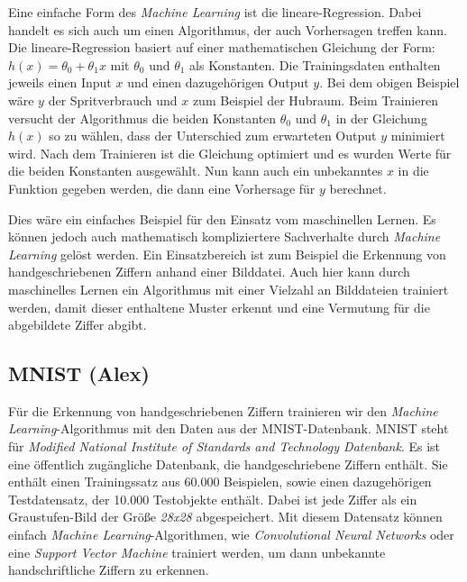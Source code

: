 Eine einfache Form des \textit{Machine Learning} ist die lineare-Regression. Dabei handelt es sich auch um einen Algorithmus, der auch Vorhersagen treffen kann.
Die lineare-Regression basiert auf einer mathematischen Gleichung der Form: $h(x) = \theta_0 + \theta_1x $ mit $\theta_0$ und $\theta_1$ als Konstanten.
Die Trainingsdaten enthalten jeweils einen Input $x$ und einen dazugehörigen Output $y$. Bei dem obigen Beispiel wäre $y$ der Spritverbrauch und $x$ zum Beispiel der
Hubraum. Beim Trainieren versucht der Algorithmus die beiden Konstanten $\theta_0$ und $\theta_1$ in der Gleichung $h(x)$ so zu wählen, 
dass der Unterschied zum erwarteten Output $y$ minimiert wird. Nach dem Trainieren ist die Gleichung optimiert und es wurden Werte für die beiden Konstanten ausgewählt.
Nun kann auch ein unbekanntes $x$ in die Funktion gegeben werden, die dann eine Vorhersage für $y$ berechnet.\cite{simon_2015}

Dies wäre ein einfaches Beispiel für den Einsatz vom maschinellen Lernen. Es können jedoch auch mathematisch kompliziertere Sachverhalte durch \textit{Machine Learning}
gelöst werden. Ein Einsatzbereich ist zum Beispiel die Erkennung von handgeschriebenen Ziffern anhand einer Bilddatei. Auch hier kann durch maschinelles Lernen ein
Algorithmus mit einer Vielzahl an Bilddateien trainiert werden, damit dieser enthaltene Muster erkennt und eine Vermutung für die abgebildete Ziffer abgibt. 

\subsection{MNIST (Alex)}
Für die Erkennung von handgeschriebenen Ziffern trainieren wir den \textit{Machine Learning}-Algorithmus mit den Daten aus der MNIST-Datenbank.
MNIST steht für \textit{Modified National Institute of Standards and Technology Datenbank}. 
Es ist eine öffentlich zugängliche Datenbank, die handgeschriebene Ziffern enthält.
Sie enthält einen Trainingssatz aus 60.000 Beispielen, sowie einen dazugehörigen Testdatensatz, der 10.000 Testobjekte enthält.
Dabei ist jede Ziffer als ein Graustufen-Bild der Größe \textit{28x28} abgespeichert.
Mit diesem Datensatz können einfach \textit{Machine Learning}-Algorithmen, wie \textit{Convolutional Neural Networks} oder eine \textit{Support Vector Machine} trainiert
werden, um dann unbekannte handschriftliche Ziffern zu erkennen.

\newpage